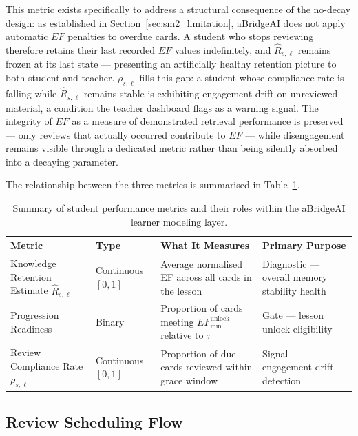 This metric exists specifically to address a structural consequence of the no-decay design: as established in Section~\ref{sec:sm2_limitation}, aBridgeAI does not apply automatic $EF$ penalties to overdue cards. A student who stops reviewing therefore retains their last recorded $EF$ values indefinitely, and $\hat{R}_{s,\ell}$ remains frozen at its last state — presenting an artificially healthy retention picture to both student and teacher. $\rho_{s,\ell}$ fills this gap: a student whose compliance rate is falling while $\hat{R}_{s,\ell}$ remains stable is exhibiting engagement drift on unreviewed material, a condition the teacher dashboard flags as a warning signal. The integrity of $EF$ as a measure of demonstrated retrieval performance is preserved — only reviews that actually occurred contribute to $EF$ — while disengagement remains visible through a dedicated metric rather than being silently absorbed into a decaying parameter.

\medskip
\noindent
The relationship between the three metrics is summarised in Table~\ref{tab:metrics_summary}.

\begin{table}[H]
\centering
\small
\renewcommand{\arraystretch}{1.4}
\caption{Summary of student performance metrics and their roles within the aBridgeAI learner modeling layer.}
\begin{tabular}{|p{3.2cm}|p{2.2cm}|p{4cm}|p{4cm}|}
\hline
\textbf{Metric} & \textbf{Type} & 
\textbf{What It Measures} & 
\textbf{Primary Purpose} \\
\hline
Knowledge Retention Estimate $\hat{R}_{s,\ell}$ & 
Continuous $[0,1]$ & 
Average normalised EF across all cards in the lesson & 
Diagnostic — overall memory stability health \\
\hline
Progression Readiness & 
Binary & 
Proportion of cards meeting $EF_{\min}^{\text{unlock}}$ 
relative to $\tau$ & 
Gate — lesson unlock eligibility \\
\hline
Review Compliance Rate $\rho_{s,\ell}$ & 
Continuous $[0,1]$ & 
Proportion of due cards reviewed within grace window & 
Signal — engagement drift detection \\
\hline
\end{tabular}
\label{tab:metrics_summary}
\end{table}

\subsection{Review Scheduling Flow}
\label{fig-sec:sm2-flow}

